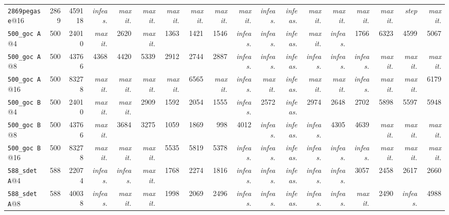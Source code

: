 {\begin{longtable}{lrrrrrrrrrrrrrrrrr}
\texttt{2869pegase}@16 & 2869 & 459118 & \textit{infeas.} & \textit{max it.} & \textit{max it.} & \textit{max it.} & \textit{max it.} & \textit{max it.} & \textit{max it.} & \textit{infeas.} & \textit{infeas.} & \textit{max it.} & \textit{max it.} & \textit{max it.} & \textit{max it.} & \textit{step} & \textit{max it.} \\
\texttt{500\_goc~A}@4 & 500 & 24010 & \textit{max it.} & 2620 & \textit{max it.} & 1363 & 1421 & 1546 & \textit{infeas.} & \textit{infeas.} & \textit{infeas.} & \textit{max it.} & \textit{infeas.} & 1766 & 6323 & 4599 & 5067 \\
\texttt{500\_goc~A}@8 & 500 & 43766 & 4368 & 4420 & 5339 & 2912 & 2744 & 2887 & \textit{infeas.} & \textit{infeas.} & \textit{infeas.} & \textit{infeas.} & \textit{infeas.} & \textit{infeas.} & \textit{max it.} & \textit{max it.} & \textit{max it.} \\
\texttt{500\_goc~A}@16 & 500 & 83278 & \textit{max it.} & \textit{max it.} & \textit{max it.} & \textit{max it.} & 6565 & \textit{max it.} & \textit{infeas.} & \textit{max it.} & \textit{infeas.} & \textit{max it.} & \textit{max it.} & \textit{infeas.} & \textit{max it.} & \textit{max it.} & 6179 \\
\texttt{500\_goc~B}@4 & 500 & 24010 & \textit{max it.} & \textit{max it.} & 2909 & 1592 & 2054 & 1555 & \textit{infeas.} & 2572 & \textit{infeas.} & 2974 & 2648 & 2702 & 5898 & 5597 & 5948 \\
\texttt{500\_goc~B}@8 & 500 & 43766 & \textit{max it.} & 3684 & 3275 & 1059 & 1869 & 998 & 4012 & \textit{infeas.} & \textit{infeas.} & \textit{infeas.} & 4305 & 4639 & \textit{max it.} & \textit{max it.} & \textit{max it.} \\
\texttt{500\_goc~B}@16 & 500 & 83278 & \textit{max it.} & \textit{max it.} & \textit{max it.} & 5535 & 5819 & 5378 & \textit{infeas.} & \textit{infeas.} & \textit{infeas.} & \textit{infeas.} & \textit{infeas.} & \textit{infeas.} & \textit{max it.} & \textit{max it.} & \textit{max it.} \\
\texttt{588\_sdet~A}@4 & 588 & 22074 & \textit{infeas.} & \textit{infeas.} & \textit{max it.} & 1768 & 2274 & 1816 & \textit{infeas.} & \textit{infeas.} & \textit{infeas.} & \textit{infeas.} & \textit{infeas.} & 3057 & 2458 & 2617 & 2660 \\
\texttt{588\_sdet~A}@8 & 588 & 40038 & \textit{infeas.} & \textit{max it.} & \textit{max it.} & 1998 & 2069 & 2496 & \textit{infeas.} & \textit{infeas.} & \textit{infeas.} & \textit{infeas.} & \textit{infeas.} & \textit{max it.} & 2490 & \textit{infeas.} & 4988 \\

\end{longtable}}
